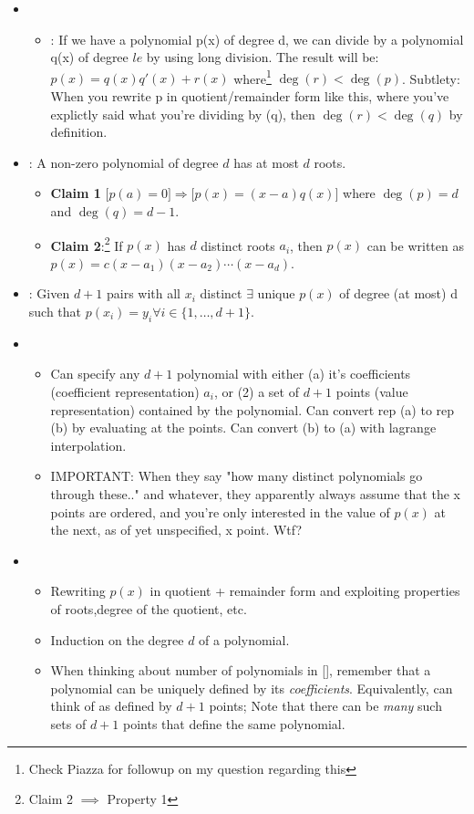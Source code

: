\documentclass[12pt]{article}
\begin{document}
\begin{itemize}
	\item {}
	\begin{itemize}
		\item {}: If we have a polynomial p(x) of degree d, we can divide by a polynomial q(x) of degree $le$ by using long division. The result will be: $p(x) = q(x)q'(x) + r(x)$ where\footnote{Check Piazza for followup on my question regarding this} $\deg(r) < \deg(p)$. Subtlety: When you rewrite p in quotient/remainder form like this, where you've explictly said what you're dividing by (q), then $\deg(r) < \deg(q)$ by definition.
	\end{itemize}
	\item {}: A non-zero polynomial of degree $d$ has at most $d$ roots.
	\begin{itemize}
		\item \textbf{Claim 1} $\big[p(a) = 0\big] \Rightarrow \big[p(x) = (x-a)q(x)\big]$ where $\deg(p)=d$ and $\deg(q) = d-1$. 
		\item \textbf{Claim 2}:\footnote{Claim 2 $\implies$ Property 1} If $p(x)$ has $d$ distinct roots $a_i$, then $p(x)$ can be written as $p(x) = c(x-a_1)(x-a_2)\cdots(x-a_d)$. 
	\end{itemize}
	\item {}: Given $d+1$ pairs with all $x_i$ distinct $\exists$ unique $p(x)$ of degree (at most) d such that $p(x_i) = y_i \forall i \in \{1,\ldots,d+1\}$.
	
	\item {}
	\begin{itemize}
		\item Can specify any $d+1$ polynomial with either (a) it's coefficients (coefficient representation) $a_i$, or (2) a set of $d+1$ points (value representation) contained by the polynomial. Can convert rep (a) to rep (b) by evaluating at the points. Can convert (b) to (a) with lagrange interpolation.  
		\item IMPORTANT: When they say "how many distinct polynomials go through these.." and whatever, they apparently always assume that the x points are ordered, and you're only interested in the value of $p(x)$ at the next, as of yet unspecified, x point. Wtf?
	\end{itemize}
	
	\item {}
	\begin{itemize}
		\item Rewriting $p(x)$ in quotient + remainder form and exploiting properties of roots,degree of the quotient, etc.
		\item Induction on the degree $d$ of a polynomial. 
		\item When thinking about number of polynomials in [\textellipsis], remember that a polynomial can be uniquely defined by its \textit{coefficients}. Equivalently, can think of as defined by $d+1$ points; Note that there can be \textit{many} such sets of $d+1$ points that define the same polynomial. 
	\end{itemize}
\end{itemize}
\end{document}
